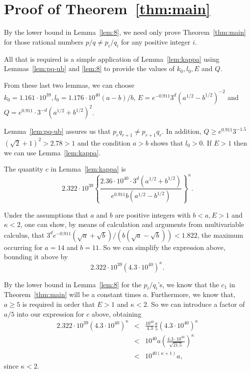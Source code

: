 \documentclass{jT}
\theoremstyle{definition}
\begin{document}
\section{Proof of Theorem~\ref{thm:main}}

By the lower bound in Lemma~\ref{lem:8}, we need only prove
Theorem~\ref{thm:main} for those rational numbers $p/q \neq 
p_{i}/q_{i}$ for any positive integer $i$. 

All that is required is a simple application of 
Lemma~\ref{lem:kappa} using Lemmas~\ref{lem:pq-ub} 
and \ref{lem:8} to provide the values of 
$k_{0},l_{0},E$ and $Q$. 

From these last two lemmas, we can choose $k_{0} = 1.161 \cdot 10^{39}, 
l_{0} = 1.176 \cdot 10^{40} (a-b)/b$, 
$E = e^{-0.911} 3^{d} { \left( a^{1/2} - b^{1/2} \right) }^{-2}$ 
and $Q = e^{0.911} \cdot 3^{-d} { \left( a^{1/2} + b^{1/2} \right) }^{2}$.

Lemma~\ref{lem:pq-ub} assures us that 
$p_{r}q_{r+1} \neq p_{r+1}q_{r}$. In addition, 
$Q \geq e^{0.911}3^{-1.5}$ $(\sqrt{2}+1)^{2} > 2.78 > 1$ 
and the condition $a > b$ shows that $l_{0} > 0$. 
If $E > 1$ then we can use Lemma~\ref{lem:kappa}. 

The quantity $c$ in Lemma~\ref{lem:kappa} is 
\begin{displaymath}
2.322 \cdot 10^{39} 
{ \left\{ \frac{2.36 \cdot 10^{40} \cdot 3^{d} \left( a^{1/2}+b^{1/2} \right)}
	       {e^{0.911} b \left( a^{1/2}-b^{1/2} \right) }
  \right\} }^{\kappa}. 
\end{displaymath}

Under the assumptions that $a$ and $b$ are positive integers 
with $b < a, E > 1$ and $\kappa < 2$, one can show, by means 
of calculation and arguments from multivariable calculus, that 
$3^{d}e^{-0.911}(\sqrt{a}+\sqrt{b})/(b(\sqrt{a}-\sqrt{b})) < 1.822$,
the maximum occurring for $a=14$ and $b=11$. So we can simplify the 
expression above, bounding it above by 
\begin{displaymath}
2.322 \cdot 10^{39} { \left(4.3 \cdot 10^{40} \right) }^{\kappa}.
\end{displaymath}

By the lower bound in Lemma~\ref{lem:8} for the $p_{i}/q_{i}$'s, we know that the
$c_{1}$ in Theorem~\ref{thm:main} will be a constant times $a$. Furthermore, we
know that, $a \geq 5$ is required in order that $E > 1$ and $\kappa < 2$. So we can
introduce a factor of $a/5$ into our expression for $c$ above, obtaining
\begin{eqnarray*}
2.322 \cdot 10^{39} { \left(4.3 \cdot 10^{40} \right) }^{\kappa}
& < & \frac{10^{40}}{4.3} \frac{a}{5} { \left( 4.3 \cdot 10^{40} \right) }^{\kappa} \\
& < &10^{40}a { \left( \frac{4.3 \cdot 10^{40}}{\sqrt{21.5}} \right) }^{\kappa} \\
& < & 10^{40(\kappa+1)}a,
\end{eqnarray*}
since $\kappa < 2$.
\end{document}

